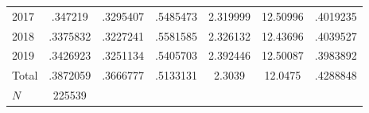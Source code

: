 {\begin{longtable}{l*{1}{cccccc}}
2017        &     .347219&    .3295407&    .5485473&    2.319999&    12.50996&    .4019235\\
2018        &    .3375832&    .3227241&    .5581585&    2.326132&    12.43696&    .4039527\\
2019        &    .3426923&    .3251134&    .5405703&    2.392446&    12.50087&    .3983892\\
Total       &    .3872059&    .3666777&    .5133131&      2.3039&     12.0475&    .4288848\\
\hline
\(N\)       &      225539&            &            &            &            &            \\
\hline\hline
\end{longtable}
}
